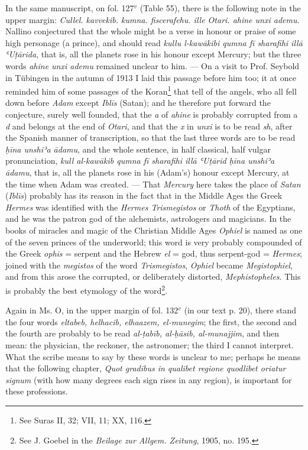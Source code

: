 \documentclass[11pt]{article}
\newcommand{\Pg}[1]{\marginpar{\footnotesize\color{gray}#1}}
\begin{document}
\par \Pg{XXII}In the same manuscript, on fol. 127$^{v}$ (Table 55), there is the following note in the upper margin: \emph{Cullel. kavvekib. kumna. fiscerafehu. ille Otari. ahine unxi ademu.} Nallino conjectured that the whole might be a verse in honour or praise of some high personage (a prince), and should read \emph{kullu l-kawākibi qumna fī sharafihi illā ʿUṭārida}, that is, all the planets rose in his honour except Mercury; but the three words \emph{ahine unxi ademu} remained unclear to him. — On a visit to Prof. Seybold in Tübingen in the autumn of 1913 I laid this passage before him too; it at once reminded him of some passages of the Koran\footnote{See Suras II, 32; VII, 11; XX, 116.} that tell of the angels, who all fell down before \emph{Adam} except \emph{Iblīs} (Satan); and he therefore put forward the conjecture, surely well founded, that the \emph{a} of \emph{ahine} is probably corrupted from a \emph{d} and belongs at the end of \emph{Otari}, and that the \emph{x} in \emph{unxi} is to be read \emph{sh}, after the Spanish manner of transcription, so that the last three words are to be read \emph{ḥīna unshiʾa ādamu}, and the whole sentence, in half classical, half vulgar pronunciation, \emph{kull al-kawākib qumna fī sharafihi illā ʿUṭārid ḥīna unshiʾa ādamu}, that is, all the planets rose in his (Adam's) honour except Mercury, at the time when Adam was created. — That \emph{Mercury} here takes the place of \emph{Satan} (\emph{Iblīs}) probably has its reason in the fact that in the Middle Ages the Greek \emph{Hermes} was identified with the \emph{Hermes Trismegistos} or \emph{Thoth} of the Egyptians, and he was the patron god of the alchemists, astrologers and magicians. In the books of miracles and magic of the Christian Middle Ages \emph{Ophiel} is named as one of the seven princes of the underworld; this word is very probably compounded of the Greek \emph{ophis} = serpent and the Hebrew \emph{el} = god, thus serpent-god = \emph{Hermes}; joined with the \emph{megistos} of the word \emph{Trismegistos}, \emph{Ophiel} became \emph{Megistophiel}, and from this arose the corrupted, or deliberately distorted, \emph{Mephistopheles}. This is probably the best etymology of the word\footnote{See J. Goebel in the \emph{Beilage zur Allgem. Zeitung}, 1905, no. 195.}.\par
\par Again in Ms. O, in the upper margin of fol. 132$^{v}$ (in our text p. 20), there stand the four words \emph{eltabeb, helhacib, elhaazem, el-munegim}; the first, the second and the fourth are probably to be read \emph{al-ṭabīb, al-ḥāsib, al-munajjim}, and then mean: the physician, the reckoner, the astronomer; the third I cannot interpret. What the scribe means to say by these words is unclear to me; perhaps he means that the following chapter, \emph{Quot gradibus in qualibet regione quodlibet oriatur signum} (with how many degrees each sign rises in any region), is important for these professions.\par
\end{document}
